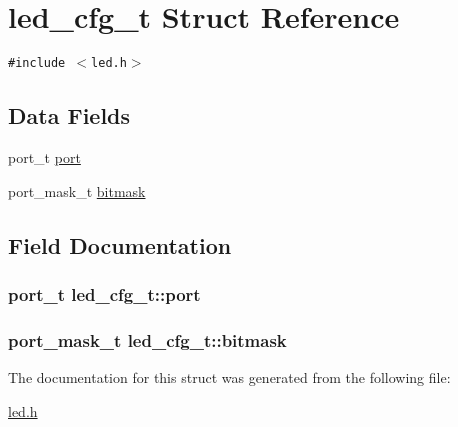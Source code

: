 \hypertarget{structled__cfg__t}{
\section{led\_\-cfg\_\-t Struct Reference}
\label{structled__cfg__t}
}
{\tt \#include $<$led.h$>$}

\subsection*{Data Fields}
\begin{CompactItemize}
\item 
port\_\-t \hyperlink{structled__cfg__t_b34f6977e823b8b9fc5a499cfda91eda}{port}
\item 
port\_\-mask\_\-t \hyperlink{structled__cfg__t_99484e753608ee625369bc25c6b15878}{bitmask}
\end{CompactItemize}


\subsection{Field Documentation}
\hypertarget{structled__cfg__t_b34f6977e823b8b9fc5a499cfda91eda}{
\subsubsection{\setlength{\rightskip}{0pt plus 5cm}port\_\-t {\bf led\_\-cfg\_\-t::port}}}
\label{structled__cfg__t_b34f6977e823b8b9fc5a499cfda91eda}


\hypertarget{structled__cfg__t_99484e753608ee625369bc25c6b15878}{
\subsubsection{\setlength{\rightskip}{0pt plus 5cm}port\_\-mask\_\-t {\bf led\_\-cfg\_\-t::bitmask}}}
\label{structled__cfg__t_99484e753608ee625369bc25c6b15878}




The documentation for this struct was generated from the following file:\begin{CompactItemize}
\item 
\hyperlink{led_8h}{led.h}\end{CompactItemize}
